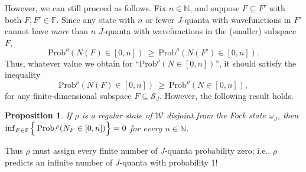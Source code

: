 \documentclass[12pt]{article}
\newtheorem{prop}{Proposition}
\theoremstyle{remark}
\theoremstyle{definition}
\newcommand{\fin}{\mathbb{F}}
\newcommand{\alg}[1]{\mathcal{#1}}
\newcommand{\hil}[1]{\mathcal{#1}}
\begin{document}
However, we can still proceed as 
follows.
Fix $n\in \mathbb{N}$, and suppose $F\subseteq F'$ with both $F,F'\in\fin$.  Since any 
state with $n$ or fewer $J$-quanta with wavefunctions in $F'$ cannot 
have \emph{more} than $n$ $J$-quanta with wavefunctions in the (smaller) subspace 
$F$, 
\begin{equation} \mathrm{Prob}^{\rho}(N(F)\in [0,n]) \:\geq \:
\mathrm{Prob}^{\rho}(N(F')\in [0,n]) .\end{equation}  
Thus, whatever value we obtain for 
``$\mathrm{Prob}^{\rho}(N\in [0,n])$'', it should satisfy the
inequality \begin{equation} 
\mathrm{Prob}^{\rho}(N(F)\in [0,n]) \: \geq \: 
\mathrm{Prob}^{\rho}(N\in [0,n]), \end{equation}
 for any
finite-dimensional subspace $F\subseteq\hil{S}_{J}$.  However, the 
following result holds.

\begin{prop} If $\rho$ is a regular state of $\alg{W}$ disjoint from 
the Fock state $\omega _{J}$, then $\inf _{F\in \fin} \, \Bigl\{ \,
    \mathrm{Prob}\,^{\rho}(N_{F}\in [0,n]) \Bigr\} =0$ for every $n\in \mathbb{N}$.
    \label{chaiken} 
\end{prop} 
\noindent Thus $\rho$ must assign every finite number of 
$J$-quanta probability zero; i.e., $\rho$ predicts an infinite number of 
$J$-quanta with probability 1!
  
\end{document}
